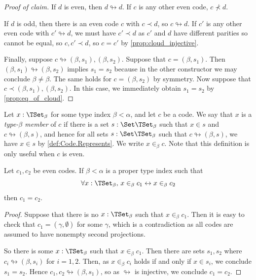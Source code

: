 \begin{proof}[Proof of claim]
  If \( d \) is even, then \( d \looparrowright d \).
  If \( c \) is any other even code, \( c \nprec d \).

  If \( d \) is odd, then there is an even code \( c \) with \( c \prec d \), so \( c \looparrowright d \).
  If \( c' \) is any other even code with \( c' \looparrowright d \), we must have \( c' \prec d \) as \( c' \) and \( d \) have different parities so cannot be equal, so \( c, c' \prec d \), so \( c = c' \) by \cref{prop:cloud_injective}.

  Finally, suppose \( c \looparrowright (\beta, s_1), (\beta, s_2) \).
  Suppose that \( c = (\beta, s_1) \).
  Then \( (\beta, s_1) \looparrowright (\beta, s_2) \) implies \( s_1 = s_2 \) because in the other constructor we may conclude \( \beta \neq \beta \).
  The same holds for \( c = (\beta, s_2) \) by symmetry.
  Now suppose that \( c \prec (\beta, s_1), (\beta, s_2) \).
  In this case, we immediately obtain \( s_1 = s_2 \) by \cref{prop:eq_of_cloud}.
\end{proof}
\begin{proposition}[extensionality]
  \label{prop:Code.ext}
  Let \( x : \TSet_\beta \) for some type index \( \beta < \alpha \), and let \( c \) be a code.
  We say that \( x \) is a \emph{type-\( \beta \) member} of \( c \) if there is a set \( s : \Set \TSet_\beta \) such that \( x \in s \) and \( c \looparrowright (\beta, s) \), and hence for all sets \( s : \Set \TSet_\beta \) such that \( c \looparrowright (\beta, s) \), we have \( x \in s \) by \cref{def:Code.Represents}.
  We write \( x \in_\beta c \).
  Note that this definition is only useful when \( c \) is even.

  Let \( c_1, c_2 \) be even codes.
  If \( \beta < \alpha \) is a proper type index such that
  \[ \forall x : \TSet_\beta,\, x \in_\beta c_1 \leftrightarrow x \in_\beta c_2 \]
  then \( c_1 = c_2 \).
\end{proposition}
\begin{proof}
  Suppose that there is no \( x : \TSet_\beta \) such that \( x \in_\beta c_1 \).
  Then it is easy to check that \( c_1 = (\gamma, \emptyset) \) for some \( \gamma \), which is a contradiction as all codes are assumed to have nonempty second projections.

  So there is some \( x : \TSet_\beta \) such that \( x \in_\beta c_1 \).
  Then there are sets \( s_1, s_2 \) where \( c_i \looparrowright (\beta, s_i) \) for \( i = 1, 2 \).
  Then, as \( x \in_\beta c_i \) holds if and only if \( x \in s_i \), we conclude \( s_1 = s_2 \).
  Hence \( c_1, c_2 \looparrowright (\beta, s_1) \), so as \( \looparrowright \) is injective, we conclude \( c_1 = c_2 \).
\end{proof}

